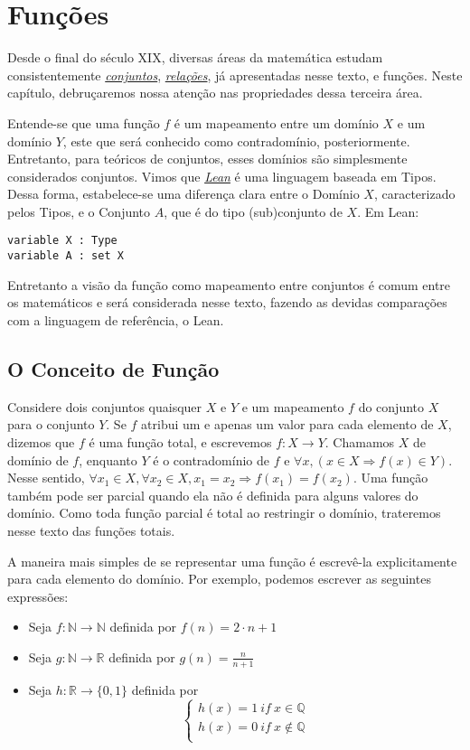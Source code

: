 \chapter{Funções}

Desde o final do século XIX, diversas áreas da matemática
estudam consistentemente \textit{\hyperlink{chapter.4}{conjuntos}},
\textit{\hyperlink{chapter.5}{relações}}, já apresentadas
nesse texto, e funções. Neste capítulo, debruçaremos nossa
atenção nas propriedades dessa terceira área.

Entende-se que uma função $f$ é um mapeamento entre um
domínio $X$ e um domínio $Y$, este que será conhecido como
contradomínio, posteriormente. Entretanto, para teóricos
de conjuntos, esses domínios são simplesmente considerados
conjuntos. Vimos que \textit{\hyperlink{chapter.2}{Lean}} é uma
linguagem baseada em Tipos. Dessa forma, estabelece-se uma
diferença clara entre o Domínio $X$, caracterizado pelos Tipos, e
o Conjunto $A$, que é do tipo (sub)conjunto de $X$. Em Lean:
\begin{lstlisting}
variable X : Type
variable A : set X
\end{lstlisting}

Entretanto a visão da função como mapeamento entre conjuntos
é comum entre os matemáticos e será considerada nesse texto,
fazendo as devidas comparações com a linguagem de referência,
o Lean.

\section{O Conceito de Função}
\label{concept}

Considere dois conjuntos quaisquer $X$ e $Y$ e um mapeamento $f$
do conjunto $X$ para o conjunto $Y$. Se $f$ atribui um e apenas
um valor para cada elemento de $X$, dizemos que $f$ é uma função total, e
escrevemos $f: X \to Y$.  Chamamos $X$ de domínio de $f$, enquanto
$Y$ é o contradomínio de $f$ e $\forall x, (x \in X  \Rightarrow f(x) \in Y)$.
Nesse sentido, $\forall x_1 \in X, \forall x_2 \in X, x_1 = x_2 \Rightarrow f(x_1) = f(x_2)$.
Uma função também pode ser parcial quando ela não é definida para alguns valores
do domínio. Como toda função parcial é total ao restringir o domínio, trateremos
nesse texto das funções totais.

A maneira mais simples de se representar uma função é escrevê-la explicitamente
para cada elemento do domínio. Por exemplo, podemos escrever as seguintes expressões:

\begin{itemize}
    \item Seja $f: \mathbb{N} \to \mathbb{N}$ definida por
    $f(n) = 2\cdot n + 1$
    \item Seja $g : \mathbb{N} \to \mathbb{R}$ definida por
    $g(n) = \frac{n}{n+1}$
    \item Seja $h : \mathbb{R} \to \{0,1\}$ definida por
    $$\left \{ \begin{array}{c}
    h(x) = 1 ~if~x \in \mathbb{Q} \\
    h(x) = 0 ~ if ~ x \not \in \mathbb{Q} \\
    \end{array}
    \right. $$
 \end{itemize}

